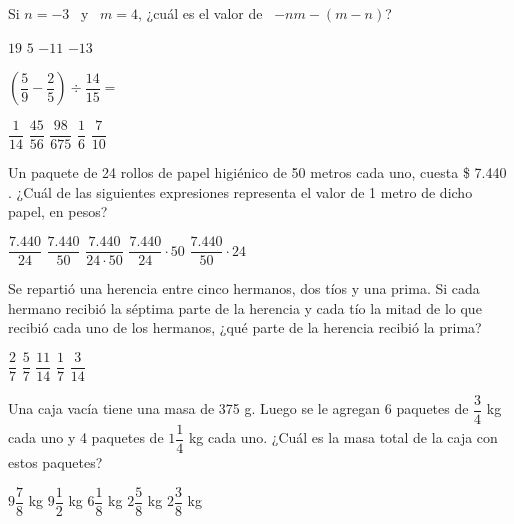 \documentclass[revolver]{srs}
\begin{document}
\begin{preguntas}[after-item-skip=2cm]

\pregunta Si $n=-3$~ y~ $m = 4$, ¿cuál es el valor de~ $-nm-\left(m-n\right)$?
\begin{vertical}
\alternativa $19$
\alternativa $5$
\alternativa $-11$
\alternativa $-13$
\end{vertical}

\pregunta $\left(\dfrac{5}{9}-\dfrac{2}{5}\right)\div\dfrac{14}{15}=$
\begin{vertical}
\alternativa $\dfrac{1}{14}$
\alternativa $\dfrac{45}{56}$
\alternativa $\dfrac{98}{675}$
\alternativa $\dfrac{1}{6}$
\alternativa $\dfrac{7}{10}$
\end{vertical}

\pregunta Un paquete de 24 rollos de papel higiénico de 50 metros cada uno, cuesta \$ 7.440 . ¿Cuál de las siguientes expresiones representa el valor de 1 metro de dicho papel, en pesos?
\begin{vertical}
\alternativa $\dfrac{7.440}{24}$
\alternativa $\dfrac{7.440}{50}$
\alternativa $\dfrac{7.440}{24\cdot 50}$
\alternativa $\dfrac{7.440}{24}\cdot 50$
\alternativa $\dfrac{7.440}{50}\cdot 24$
\end{vertical}

\pregunta Se repartió una herencia entre cinco hermanos, dos tíos y una prima. Si cada hermano recibió la séptima parte de la herencia y cada tío la mitad de lo que recibió cada uno de los hermanos, ¿qué parte de la herencia recibió la prima?
\begin{vertical}
\alternativa $\dfrac{2}{7}$
\alternativa $\dfrac{5}{7}$
\alternativa $\dfrac{11}{14}$
\alternativa $\dfrac{1}{7}$
\alternativa $\dfrac{3}{14}$
\end{vertical}

\pregunta Una caja vacía tiene una masa de 375 g. Luego se le agregan 6 paquetes de $\dfrac{3}{4}$ kg cada uno y 4 paquetes de $1\dfrac{1}{4}$ kg cada uno. ¿Cuál es la masa total de la caja con estos paquetes?
\begin{vertical}
\alternativa $9\dfrac{7}{8}$ kg
\alternativa $9\dfrac{1}{2}$ kg
\alternativa $6\dfrac{1}{8}$ kg
\alternativa $2\dfrac{5}{8}$ kg
\alternativa $2\dfrac{3}{8}$ kg
\end{vertical}


\end{preguntas}
\end{document}
